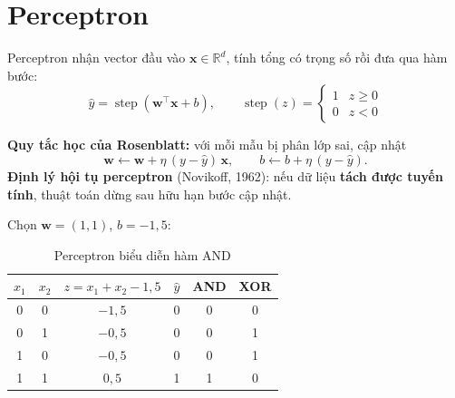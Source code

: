 \section{Perceptron}

\begin{definition}[Perceptron]
Perceptron nhận vector đầu vào $\mathbf{x} \in \mathbb{R}^d$, tính tổng có trọng số rồi đưa qua hàm bước:
\begin{equation}
    \hat{y} = \operatorname{step}(\mathbf{w}^{\top}\mathbf{x} + b), \qquad \operatorname{step}(z) = \begin{cases} 1 & z \geq 0 \\ 0 & z < 0 \end{cases}
\end{equation}
\end{definition}

\noindent\textbf{Quy tắc học của Rosenblatt:} với mỗi mẫu bị phân lớp sai, cập nhật
\begin{equation}
    \mathbf{w} \leftarrow \mathbf{w} + \eta\,(y - \hat{y})\,\mathbf{x}, \qquad b \leftarrow b + \eta\,(y - \hat{y}).
\end{equation}
\textbf{Định lý hội tụ perceptron} (Novikoff, 1962): nếu dữ liệu \textbf{tách được tuyến tính}, thuật toán dừng sau hữu hạn bước cập nhật.


\begin{example}
Chọn $\mathbf{w} = (1, 1)$, $b = -1{,}5$:
\end{example}

\begin{table}[H]
\centering
\begin{tabular}{|c|c|c|c|c|c|}
\hline
$x_1$ & $x_2$ & $z = x_1 + x_2 - 1{,}5$ & $\hat{y}$ & AND & XOR \\
\hline
0 & 0 & $-1{,}5$ & 0 & 0 & 0 \\ \hline
0 & 1 & $-0{,}5$ & 0 & 0 & 1 \\ \hline
1 & 0 & $-0{,}5$ & 0 & 0 & 1 \\ \hline
1 & 1 & $0{,}5$ & 1 & 1 & 0 \\ \hline
\end{tabular}
\caption{Perceptron biểu diễn hàm AND}
\label{tab:and}
\end{table}

